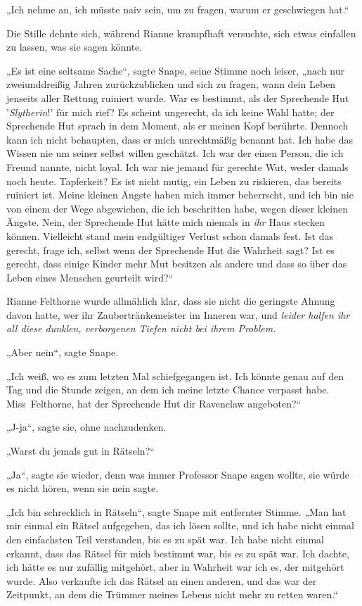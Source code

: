 {„Ich nehme an, ich müsste naiv sein, um zu fragen, warum er geschwiegen hat.“

Die Stille dehnte sich, während Rianne krampfhaft versuchte, sich etwas einfallen zu lassen, was sie sagen könnte.

„Es ist eine seltsame Sache“, sagte Snape, seine Stimme noch leiser, „nach nur zweiunddreißig Jahren zurückzublicken und sich zu fragen, wann dein Leben jenseits aller Rettung ruiniert wurde. War es bestimmt, als der Sprechende Hut '\emph{Slytherin}!' für mich rief? Es scheint ungerecht, da ich keine Wahl hatte; der Sprechende Hut sprach in dem Moment, als er meinen Kopf berührte. Dennoch kann ich nicht behaupten, dass er mich unrechtmäßig benannt hat. Ich habe das Wissen nie um seiner selbst willen geschätzt. Ich war der einen Person, die ich Freund nannte, nicht loyal. Ich war nie jemand für gerechte Wut, weder damals noch heute. Tapferkeit? Es ist nicht mutig, ein Leben zu riskieren, das bereits ruiniert ist. Meine kleinen Ängste haben mich immer beherrscht, und ich bin nie von einem der Wege abgewichen, die ich beschritten habe, wegen dieser kleinen Ängste. Nein, der Sprechende Hut hätte mich niemals in \emph{ihr} Haus stecken können. Vielleicht stand mein endgültiger Verlust schon damals fest. Ist das gerecht, frage ich, selbst wenn der Sprechende Hut die Wahrheit sagt? Ist es gerecht, dass einige Kinder mehr Mut besitzen als andere und dass so über das Leben eines Menschen geurteilt wird?“

Rianne Felthorne wurde allmählich klar, dass sie nicht die geringste Ahnung davon hatte, wer ihr Zaubertränkemeister im Inneren war, und \emph{leider halfen ihr all diese dunklen, verborgenen Tiefen nicht bei ihrem Problem.}

„Aber nein“, sagte Snape.

„Ich weiß, wo es zum letzten Mal schiefgegangen ist. Ich könnte genau auf den Tag und die Stunde zeigen, an dem ich meine letzte Chance verpasst habe. Miss~Felthorne, hat der Sprechende Hut dir Ravenclaw angeboten?“

„J-ja“, sagte sie, ohne nachzudenken.

„Warst du jemals gut in Rätseln?“

„Ja“, sagte sie wieder, denn was immer Professor Snape sagen wollte, sie würde es nicht hören, wenn sie nein sagte.

„Ich bin schrecklich in Rätseln“, sagte Snape mit entfernter Stimme. „Man hat mir einmal ein Rätsel aufgegeben, das ich lösen sollte, und ich habe nicht einmal den einfachsten Teil verstanden, bis es zu spät war. Ich habe nicht einmal erkannt, dass das Rätsel für mich bestimmt war, bis es zu spät war. Ich dachte, ich hätte es nur zufällig mitgehört, aber in Wahrheit war ich es, der mitgehört wurde. Also verkaufte ich das Rätsel an einen anderen, und das war der Zeitpunkt, an dem die Trümmer meines Lebens nicht mehr zu retten waren.“

}
